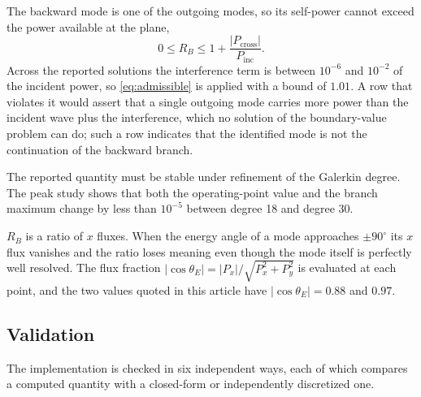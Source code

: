 The backward mode is one of the outgoing modes, so its
self-power cannot exceed the power available at the plane,
\begin{equation}
\label{eq:admissible}
0\le R_B\le1+\frac{|P_{\text{cross}}|}{P_{\text{inc}}} .
\end{equation}
Across the reported solutions the interference term is between $10^{-6}$ and
$10^{-2}$ of the incident power, so \eqref{eq:admissible} is applied with a
bound of $1.01$.  A row that violates it would assert that a single outgoing
mode carries more power than the incident wave plus the interference, which no
solution of the boundary-value problem can do; such a row indicates that the
identified mode is not the continuation of the backward branch.

The reported quantity must be stable under refinement of
the Galerkin degree.  The peak study shows that both the
operating-point value and the branch maximum change by less than $10^{-5}$
between degree 18 and degree 30.

$R_B$ is a ratio of $x$ fluxes.
When the energy angle of a mode approaches $\pm90^{\circ}$ its $x$ flux
vanishes and the ratio loses meaning even though the mode itself is perfectly
well resolved.  The flux fraction
$|\cos\theta_E|=|P_x|/\sqrt{P_x^2+P_y^2}$ is evaluated at each point, and the two values quoted in this article have $|\cos\theta_E|=0.88$ and $0.97$.

\subsection{Validation}
\label{sec:numerics_verification}

The implementation is checked in six independent ways, each of which compares
a computed quantity with a closed-form or independently discretized one.

